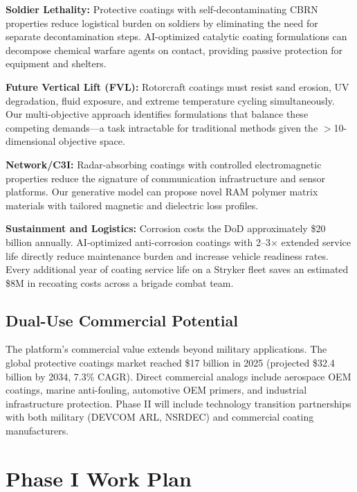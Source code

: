 \documentclass[11pt,letterpaper]{article}
\begin{document}
\textbf{Soldier Lethality:} Protective coatings with self-decontaminating CBRN properties reduce logistical burden on soldiers by eliminating the need for separate decontamination steps. AI-optimized catalytic coating formulations can decompose chemical warfare agents on contact, providing passive protection for equipment and shelters.

\textbf{Future Vertical Lift (FVL):} Rotorcraft coatings must resist sand erosion, UV degradation, fluid exposure, and extreme temperature cycling simultaneously. Our multi-objective approach identifies formulations that balance these competing demands---a task intractable for traditional methods given the $>$10-dimensional objective space.

\textbf{Network/C3I:} Radar-absorbing coatings with controlled electromagnetic properties reduce the signature of communication infrastructure and sensor platforms. Our generative model can propose novel RAM polymer matrix materials with tailored magnetic and dielectric loss profiles.

\textbf{Sustainment and Logistics:} Corrosion costs the DoD approximately \$20 billion annually. AI-optimized anti-corrosion coatings with 2--3$\times$ extended service life directly reduce maintenance burden and increase vehicle readiness rates. Every additional year of coating service life on a Stryker fleet saves an estimated \$8M in recoating costs across a brigade combat team.

\subsection{Dual-Use Commercial Potential}

The platform's commercial value extends beyond military applications. The global protective coatings market reached \$17 billion in 2025 (projected \$32.4 billion by 2034, 7.3\% CAGR). Direct commercial analogs include aerospace OEM coatings, marine anti-fouling, automotive OEM primers, and industrial infrastructure protection. Phase II will include technology transition partnerships with both military (DEVCOM ARL, NSRDEC) and commercial coating manufacturers.


\section{Phase I Work Plan}
\label{sec:workplan}
\end{document}

